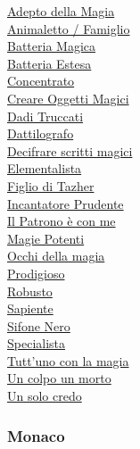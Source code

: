 \begin{multicols}{3}
{\begin{flushleft}
\hyperlink{Adepto della Magia}{Adepto della Magia}\\
\hyperlink{Animaletto / Famiglio}{Animaletto / Famiglio}\\
\hyperlink{Batteria Magica}{Batteria Magica}\\
\hyperlink{Batteria Estesa}{Batteria Estesa}\\
\hyperlink{Concentrato}{Concentrato}\\
\hyperlink{Creare Oggetti Magici}{Creare Oggetti Magici}\\
\hyperlink{Dadi Truccati}{Dadi Truccati}\\
\hyperlink{Dattilografo}{Dattilografo}\\
\hyperlink{Decifrare scritti magici}{Decifrare scritti magici}\\
\hyperlink{Elementalista}{Elementalista}\\
\hyperlink{Figlio di Tazher}{Figlio di Tazher}\\
\hyperlink{Incantatore Prudente}{Incantatore Prudente}\\
\hyperlink{Il Patrono è con me}{Il Patrono è con me}\\
\hyperlink{Magie Potenti}{Magie Potenti}\\
\hyperlink{Occhi della magia}{Occhi della magia}\\
\hyperlink{Prodigioso}{Prodigioso}\\
\hyperlink{Robusto}{Robusto}\\
\hyperlink{Sapiente}{Sapiente}\\
\hyperlink{Sifone Nero}{Sifone Nero}\\
\hyperlink{Specialista}{Specialista}\\
\hyperlink{Tutt'uno con la magia}{Tutt'uno con la magia}\\
\hyperlink{Un colpo un morto}{Un colpo un morto}\\
\hyperlink{Un solo credo}{Un solo credo}

\titlespacing*{\subsubsection}{0pt}{0.5em}{0.5em}\subsubsection*{Monaco}


\end{flushleft}}
\end{multicols}
